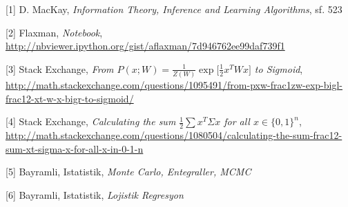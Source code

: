 \documentclass[12pt,fleqn]{article}\usepackage{../../common}
\begin{document}
[1] D. MacKay, {\em Information Theory, Inference and Learning Algorithms}, sf. 523

[2] Flaxman, {\em Notebook}, \url{http://nbviewer.ipython.org/gist/aflaxman/7d946762ee99daf739f1}

[3] Stack Exchange, {\em From $P(x;W) = \frac{1}{Z(W)} \exp \bigl[ \frac{1}{2} x^T W x
  \bigr]$ to Sigmoid}, \url{http://math.stackexchange.com/questions/1095491/from-pxw-frac1zw-exp-bigl-frac12-xt-w-x-bigr-to-sigmoid/}

[4] Stack Exchange, {\em Calculating the sum $\frac{1}{2} \sum x^T \Sigma x$ for all $x \in
  \{0,1\}^n$}, \url{http://math.stackexchange.com/questions/1080504/calculating-the-sum-frac12-sum-xt-sigma-x-for-all-x-in-0-1-n}

[5] Bayramli, Istatistik, {\em Monte Carlo, Entegraller, MCMC}

[6] Bayramli, Istatistik, {\em Lojistik Regresyon}
\end{document}
